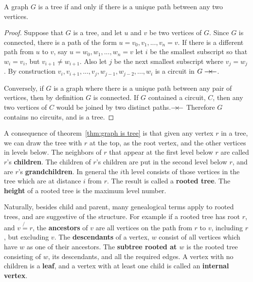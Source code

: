\begin{center}
\end{center}

\begin{thm}\label{thm:graph is tree}
 A graph $G$ is a tree if and only if there is a unique path between any two vertices.
\end{thm}
\begin{proof}
 Suppose that $G$ is a tree, and let $u$ and $v$ be two vertices of $G$. Since
 $G$ is connected, there is a path of the form $u=v_0,v_1,...,v_n=v$. 
 If there is a different  path from $u$ to $v$, say $u=w_0,w_1,...,w_n=v$ let $i$ be the smallest subscript
 so that $w_i=v_i$, but $v_{i+1}\neq w_{i+1}$. Also let $j$ be the next smallest subscript where $v_j=w_j$.
 By construction $v_i,v_{i+1},...,v_j,w_{j-1},w_{j-2},...,w_i$ is a circuit in $G \rightarrow \!\leftarrow$.
 
 Conversely, if $G$ is a graph where there is a unique path between any pair of vertices, then
 by definition $G$ is connected. If $G$ contained a circuit, $C$, then any two vertices of $C$ would be joined
 by two distinct paths.$\rightarrow \!\leftarrow$ Therefore $G$ contains no circuits, and is a tree.
\end{proof}

A consequence of theorem~\ref{thm:graph is tree} is that given any vertex $r$ in a tree, 
we can draw the tree with $r$ at the
top, as the root vertex,  and the other vertices in levels below.  The neighbors of $r$ that appear at the first level below $r$
are called $r$'s {\bfseries {children}}. The children of $r$'s children are put
in the second level below $r$, and are $r$'s {\bfseries {grandchildren}}. In general the $i$th level consists of those
vertices in the tree which are at distance $i$ from $r$. The result is called a {\bfseries {rooted tree}}. The {\bfseries {height}} of a rooted tree is the maximum level number.

Naturally, besides child and parent, many genealogical terms apply to rooted trees,
and are suggestive of the structure. For example if  a rooted tree
has root $r$, and $v\not{=}r$, the {\bfseries {ancestors}} of $v$ are all vertices on the 
path from $r$ to $v$, including $r$, but excluding $v$. The {\bfseries {descendants}} of a vertex, $w$
consist of all vertices which have $w$ as one of their ancestors. The {\bfseries {subtree rooted at $w$}}
is the rooted tree consisting of $w$, its descendants, and all the required edges. 
A vertex with no children is a {\bfseries {leaf}}, and a vertex with at least one child is called an
{\bfseries {internal vertex}}.


